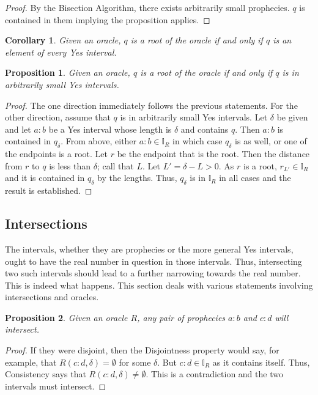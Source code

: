 \documentclass[12pt]{article}
\newtheorem{corollary}{Corollary}[section]
\newtheorem{proposition}{Proposition}[section]
\begin{document}
\begin{proof}
    By the Bisection Algorithm, there exists arbitrarily small prophecies. $q$ is contained in them implying the proposition applies. 
\end{proof}



\begin{corollary}
    Given an oracle, $q$ is a root of the oracle if and only if $q$ is an element of every Yes interval. 
\end{corollary}

\begin{proposition}
    Given an oracle, $q$ is a root of the oracle if and only if $q$ is in arbitrarily small Yes intervals. 
\end{proposition}

\begin{proof}
   The one direction immediately follows the previous statements. For the other direction, assume that $q$ is in arbitrarily small Yes intervals. Let $\delta$ be given and let $a:b$ be a Yes interval whose length is $\delta$ and contains $q$. Then $a:b$ is contained in $q_\delta$. From above, either $a:b \in \mathbb{I}_R$ in which case $q_\delta$ is as well, or one of the endpoints is a root. Let $r$ be the endpoint that is the root. Then the distance from $r$ to $q$ is less than $\delta$; call that $L$. Let $L' = \delta - L > 0$. As $r$ is a root, $r_{L'} \in \mathbb{I}_R$ and it is contained in $q_\delta$ by the lengths. Thus, $q_\delta$ is in $\mathbb{I}_R$ in all cases and the result is established. 
\end{proof}


\subsection{Intersections}

The intervals, whether they are prophecies or the more general Yes intervals, ought to have the real number in question in those intervals. Thus, intersecting two such intervals should lead to a further narrowing towards the real number. This is indeed what happens. This section deals with various statements involving intersections and oracles. 


\begin{proposition}\label{os:prointer}
    Given an oracle $R$, any pair of prophecies $a:b$ and $c:d$ will intersect. 
\end{proposition}

\begin{proof}
    If they were disjoint, then the Disjointness property would say, for example, that $R(c:d, \delta)= \emptyset$ for some $\delta$. But $c:d \in \mathbb{I}_R$ as it contains itself. Thus, Consistency says that $R(c:d, \delta) \neq \emptyset$. This is a contradiction and the two intervals must intersect. 
\end{proof}
\end{document}
